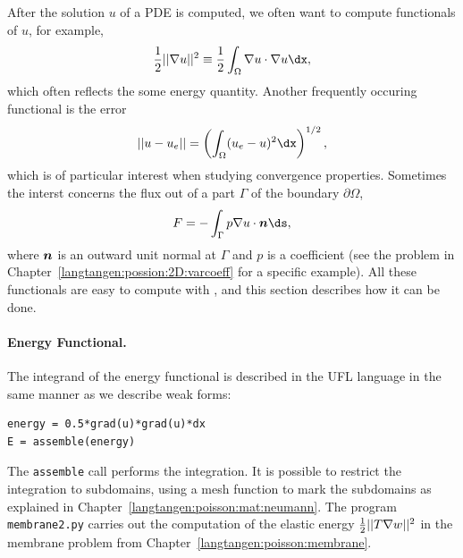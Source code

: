 After the solution $u$ of a PDE is computed, we often want to compute
functionals of $u$, for example,
\begin{equation}
{1\over2}||\nabla u||^2 \equiv {1\over2}\int_\Omega \nabla u\cdot \nabla u\dx,
\label{langtangen:poisson1:functionals:energy}
\end{equation}
which often reflects the some energy quantity.
Another frequently occuring functional is the error
\begin{equation}
||u-u_e|| = \left(\int_\Omega (u_e-u)^2\dx\right)^{1/2},
\label{langtangen:poisson1:functionals:error}
\end{equation}
which is of particular interest when studying convergence properties.
Sometimes the interst concerns the flux out of a part $\Gamma$ of
the boundary $\partial\Omega$,
\begin{equation}
F = -\int_\Gamma p\nabla u\cdot\langtangennormalvec\ds,
\label{langtangen:poisson1:functionals:flux}
\end{equation}
where ${\mbox{\boldmath $n$}}$ is an outward unit normal at $\Gamma$ and $p$ is a
coefficient (see the problem in Chapter~\ref{langtangen:possion:2D:varcoeff}
for a specific example).
All these functionals are easy to compute with \fenics, and this section
describes how it can be done.

\paragraph{Energy Functional.}
The integrand of the
energy functional 
is described in the UFL language in the same manner as we describe
weak forms:
\begin{Verbatim}[fontsize=\fontsize{10pt}{10pt},tabsize=8,baselinestretch=1.05,
fontfamily=tt,xleftmargin=7mm]
energy = 0.5*grad(u)*grad(u)*dx
E = assemble(energy)
\end{Verbatim}
\noindent
The {\fontsize{12pt}{12pt}\texttt{assemble}} call performs the integration.
It is possible to restrict the integration to subdomains, using
a mesh function to mark the subdomains as explained in
Chapter~\ref{langtangen:poisson:mat:neumann}.
The program {\fontsize{12pt}{12pt}\texttt{membrane2.py}} carries out the computation of
the elastic energy ${1\over2}||T\nabla w||^2$ in the membrane problem from
Chapter~\ref{langtangen:poisson:membrane}.

